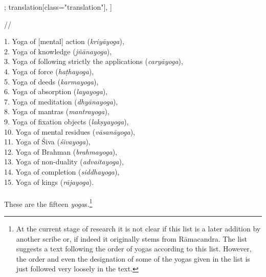 \documentclass[12pt]{article}%
\begin{document}
\begin{alignment}[
    texts=edition[class="edition"];
    translation[class="translation"],
    ]
\begin{edition}
\begin{prose}
 //\\\end{prose}
    \end{edition}
    \begin{translation}
\begin{tlate}1. Yoga of [mental] action (\textit{kriyāyoga}), \\ 2. Yoga of knowledge (\textit{jñānayoga}),\\ 3. Yoga of following strictly the applications (\textit{caryāyoga}),\\ 4. Yoga of force (\textit{haṭhayoga}),\\ 5. Yoga of deeds (\textit{karmayoga}),\\ 6. Yoga of absorption (\textit{layayoga}),\\ 7. Yoga of meditation (\textit{dhyānayoga}),\\ 8. Yoga of mantras (\textit{mantrayoga}),\\ 9. Yoga of fixation objects (\textit{lakṣyayoga}),\\ 10. Yoga of mental residues (\textit{vāsanāyoga}),\\ 11. Yoga of Śiva (\textit{śivayoga}),\\ 12. Yoga of Brahman (\textit{brahmayoga}),\\ 13. Yoga of non-duality (\textit{advaitayoga}),\\ 14. Yoga of completion (\textit{siddhayoga}),\\ 15. Yoga of kings (\textit{rājayoga}).\\ \\ These are the fifteen \textit{yoga}s.\footnote{At the current stage of research it is not clear if this list is a later addition by another scribe or, if indeed it originally stems from Rāmacandra. The list suggests a text following the order of yogas according to this list. However, the order and even the designation of some of the yogas given in the list is just followed very loosely in the text.}\bigskip \end{tlate}
    \end{translation}
    \end{alignment}
\end{document}
